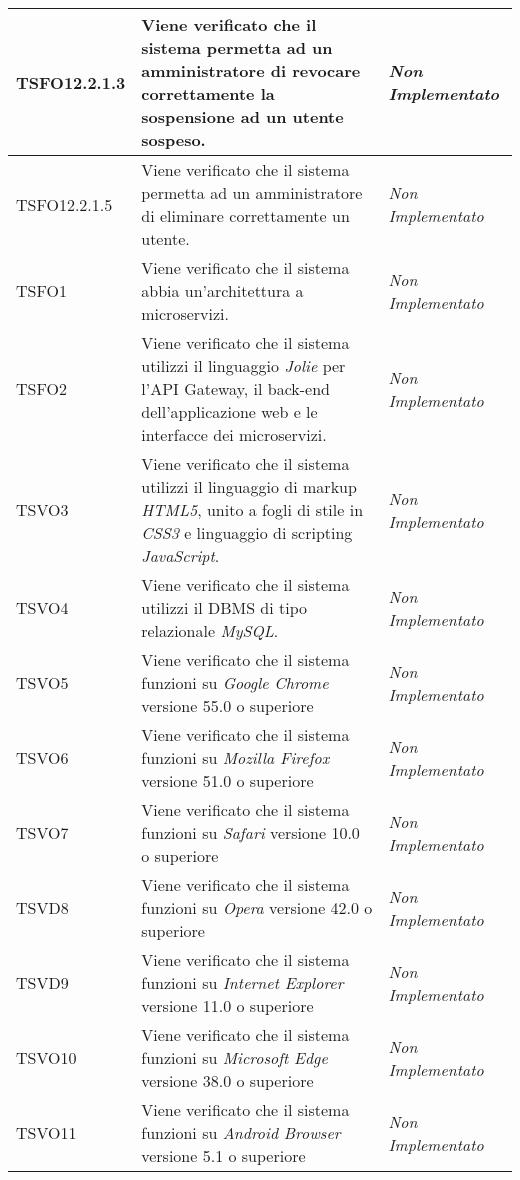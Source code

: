 \begin{longtable}{|>{\centering\arraybackslash}p{2.3cm}|>{\centering\arraybackslash}p{7.5cm} | >{\centering\arraybackslash}p{3.8cm}|}
		\hypertarget{TSFO12.2.1.3}{TSFO12.2.1.3} & Viene verificato che il sistema permetta ad un amministratore di revocare correttamente la sospensione ad un utente sospeso. & \textit{Non Implementato}\\ \hline
		\hypertarget{TSFO12.2.1.5}{TSFO12.2.1.5} & Viene verificato che il sistema permetta ad un amministratore di eliminare correttamente un utente. & \textit{Non Implementato}\\ \hline		
		\hypertarget{TSVO1}{TSFO1} & Viene verificato che il sistema abbia un'architettura a microservizi. & \textit{Non Implementato}\\ \hline
		\hypertarget{TSVO2}{TSFO2} & Viene verificato che il sistema utilizzi il linguaggio \textit{Jolie} per l'API Gateway, il back-end dell'applicazione web e le interfacce dei microservizi. & \textit{Non Implementato}\\ \hline
		\hypertarget{TSVO3}{TSVO3} & Viene verificato che il sistema utilizzi il linguaggio di markup \textit{HTML5}, unito a fogli di stile in \textit{CSS3} e linguaggio di scripting \textit{JavaScript}. & \textit{Non Implementato}\\ \hline
		\hypertarget{TSVO4}{TSVO4} & Viene verificato che il sistema utilizzi il DBMS di tipo relazionale \textit{MySQL}. & \textit{Non Implementato}\\ \hline
		\hypertarget{TSVO5}{TSVO5} & Viene verificato che il sistema funzioni su \textit{Google Chrome} versione 55.0 o superiore & \textit{Non Implementato}\\ \hline
		\hypertarget{TSVO6}{TSVO6} & Viene verificato che il sistema funzioni su \textit{Mozilla Firefox} versione 51.0 o superiore & \textit{Non Implementato}\\ \hline
		\hypertarget{TSVO7}{TSVO7} & Viene verificato che il sistema funzioni su \textit{Safari} versione 10.0 o superiore & \textit{Non Implementato}\\ \hline
		\hypertarget{TSVD8}{TSVD8} & Viene verificato che il sistema funzioni su \textit{Opera} versione 42.0 o superiore & \textit{Non Implementato}\\ \hline
		\hypertarget{TSVD9}{TSVD9} & Viene verificato che il sistema funzioni su \textit{Internet Explorer} versione 11.0 o superiore & \textit{Non Implementato}\\ \hline
		\hypertarget{TSVO10}{TSVO10} & Viene verificato che il sistema funzioni su \textit{Microsoft Edge} versione 38.0 o superiore & \textit{Non Implementato}\\ \hline
		\hypertarget{TSVO11}{TSVO11} & Viene verificato che il sistema funzioni su \textit{Android Browser} versione 5.1 o superiore & \textit{Non Implementato}\\ \hline

\end{longtable}
